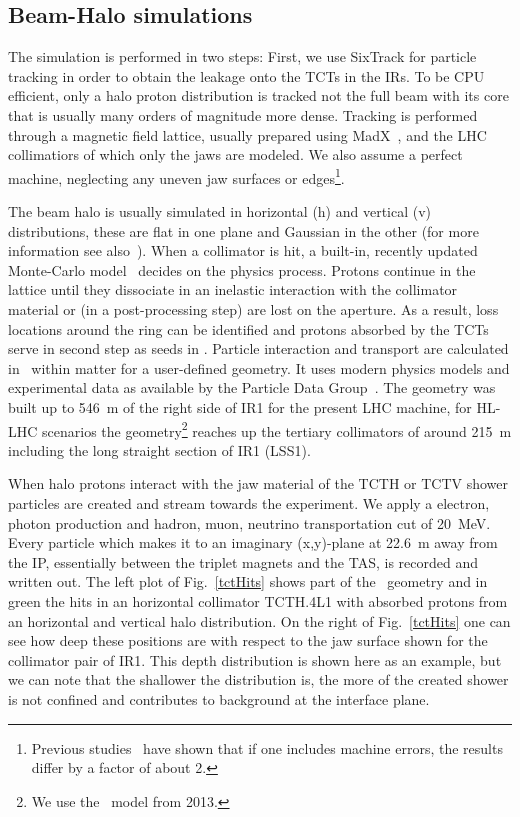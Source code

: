 \subsection{Beam-Halo simulations}
The simulation is performed in two steps: First, we use SixTrack for particle tracking in order to obtain the leakage onto the TCTs in the IRs. To be CPU efficient, only a halo proton distribution is tracked not the full beam with its core that is usually many orders of magnitude more dense. Tracking is performed through a magnetic field lattice, usually prepared using MadX~\cite{madx}, and the LHC collimatiors of which only the jaws are modeled. We also assume a perfect machine, neglecting any uneven jaw surfaces or edges\footnote{Previous studies~\cite{roderikSimMeasPaper} have shown that if one includes machine errors, the results differ by a factor of about 2.}.

The beam halo is usually simulated in horizontal (h) and vertical (v) distributions, these are flat in one plane and Gaussian in the other (for more information see also~\cite{chiarasThesis}). When a collimator is hit, a built-in, recently updated Monte-Carlo model~\cite{claudiasThesis} decides on the physics process. Protons continue in the lattice until they dissociate in an inelastic interaction with the collimator material or (in a post-processing step) are lost on the aperture. As a result, loss locations around the ring can be identified and protons absorbed by the TCTs serve in second step as seeds in \fluka. Particle interaction and transport are calculated in \fluka~within matter for a user-defined geometry. It uses modern physics models and experimental data as available by the Particle Data Group~\cite{pdg}. The geometry was built up to 546~m of the right side of IR1 for the present LHC machine, for HL-LHC scenarios the geometry\footnote{We use the \fluka~model from 2013.} reaches up the tertiary collimators of around 215~m including the long straight section of IR1 (LSS1).

When halo protons interact with the jaw material of the TCTH or TCTV shower particles are created and stream towards the experiment. We apply a electron, photon production and hadron, muon, neutrino transportation cut of 20~MeV. Every particle which makes it to an imaginary (x,y)-plane at 22.6~m away from the IP, essentially between the triplet magnets and the TAS, is recorded and written out. The left plot of Fig.~\ref{tctHits} shows part of the \fluka~geometry and in green the hits in an horizontal collimator TCTH.4L1 with absorbed protons from an horizontal and vertical halo distribution. On the right of Fig.~\ref{tctHits} one can see how deep these positions are with respect to the jaw surface shown for the collimator pair of IR1. This depth distribution is shown here as an example, but we can note that the shallower the distribution is, the more of the created shower is not confined and contributes to background at the interface plane.

